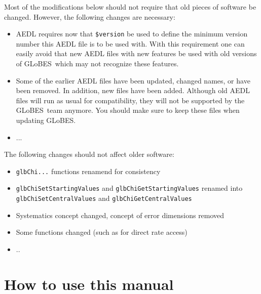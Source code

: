 \documentclass[a4paper,12pt,twoside]{book}
\newcommand{\GLOBES}{{\sf GLoBES}}
\begin{document}
Most of the modifications below should not require that old pieces of software be changed. 
However, the following changes are necessary:
\begin{itemize}
\item
 AEDL requires now that {\tt \$version} be used to define the minimum version number this AEDL
file is to be used with. With this requirement one can easily avoid that new AEDL
files with new features be used with old versions of \GLOBES\ which may not recognize these features.
\item
 Some of the earlier AEDL files have been updated, changed names, or have been removed. In addition, new files have been added. Although old AEDL files will run as usual for compatibility, they will not be
supported by the \GLOBES\ team anymore. You should make sure to keep these files when updating \GLOBES . 
\item
 ...
\end{itemize}
The following changes should not affect older software:
\begin{itemize}
\item
 {\tt glbChi...} functions renamend for consistency
\item
 {\tt glbChiSetStartingValues} and {\tt glbChiGetStartingValues} renamed into 
{\tt glbChiSetCentralValues} and {\tt glbChiGetCentralValues}
\item
 Systematics concept changed, concept of error dimensions removed
\item
 Some functions changed (such as for direct rate access)
\item
 ..
\end{itemize}

\cleardoublepage
\tableofcontents

\cleardoublepage
\setcounter{page}{1}

\chapter*{How to use this manual}
\end{document}
